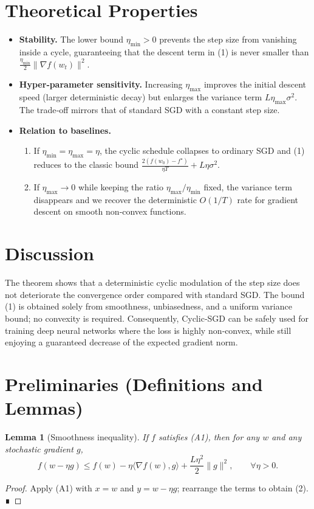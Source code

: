 \documentclass[11pt]{article}
\newtheorem{lemma}{Lemma}
\begin{document}
\section*{Theoretical Properties}
\begin{itemize}
    \item \textbf{Stability.} The lower bound $\eta_{\min}>0$ prevents the step size from vanishing inside a cycle, guaranteeing that the descent term in (1) is never smaller than $\frac{\eta_{\min}}{2}\|\nabla f(w_{t})\|^{2}$.
    \item \textbf{Hyper‑parameter sensitivity.} Increasing $\eta_{\max}$ improves the initial descent speed (larger deterministic decay) but enlarges the variance term $L\eta_{\max}\sigma^{2}$. The trade‑off mirrors that of standard SGD with a constant step size.
    \item \textbf{Relation to baselines.}
    \begin{enumerate}
        \item If $\eta_{\min}=\eta_{\max}=\eta$, the cyclic schedule collapses to ordinary SGD and (1) reduces to the classic bound $\frac{2(f(w_{0})-f^{\star})}{\eta T}+L\eta\sigma^{2}$.
        \item If $\eta_{\max}\to0$ while keeping the ratio $\eta_{\max}/\eta_{\min}$ fixed, the variance term disappears and we recover the deterministic $O(1/T)$ rate for gradient descent on smooth non‑convex functions.
    \end{enumerate}
\end{itemize}

\section*{Discussion}
The theorem shows that a deterministic cyclic modulation of the step size does not deteriorate the convergence order compared with standard SGD. The bound (1) is obtained solely from smoothness, unbiasedness, and a uniform variance bound; no convexity is required. Consequently, Cyclic‑SGD can be safely used for training deep neural networks where the loss is highly non‑convex, while still enjoying a guaranteed decrease of the expected gradient norm.

\section*{Preliminaries (Definitions and Lemmas)}
\begin{lemma}[Smoothness inequality]\label{lem:smooth}
If $f$ satisfies (A1), then for any $w$ and any stochastic gradient $g$,
\[
f(w-\eta g)\le f(w)-\eta\langle\nabla f(w),g\rangle+\frac{L\eta^{2}}{2}\|g\|^{2},
\qquad \forall\eta>0.
\tag{2}
\]
\end{lemma}
\begin{proof}
Apply (A1) with $x=w$ and $y=w-\eta g$; rearrange the terms to obtain (2). ∎
\end{proof}
\end{document}

